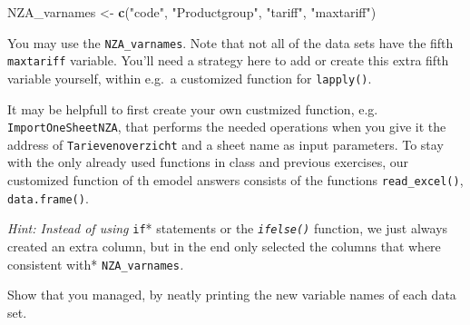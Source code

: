 \documentclass[]{article}
\newenvironment{Shaded}{\begin{snugshade}}{\end{snugshade}}
\newcommand{\KeywordTok}[1]{\textcolor[rgb]{0.13,0.29,0.53}{\textbf{#1}}}
\newcommand{\NormalTok}[1]{#1}
\newcommand{\StringTok}[1]{\textcolor[rgb]{0.31,0.60,0.02}{#1}}
\begin{document}
\begin{Shaded}
\begin{Highlighting}[]
\NormalTok{NZA_varnames <-}\StringTok{ }\KeywordTok{c}\NormalTok{(}\StringTok{"code"}\NormalTok{, }\StringTok{"Productgroup"}\NormalTok{, }\StringTok{"tariff"}\NormalTok{, }\StringTok{"maxtariff"}\NormalTok{)}
\end{Highlighting}
\end{Shaded}

You may use the \texttt{NZA\_varnames}. Note that not all of the data
sets have the fifth \texttt{maxtariff} variable. You'll need a strategy
here to add or create this extra fifth variable yourself, within e.g.~a
customized function for \texttt{lapply()}.

It may be helpfull to first create your own custmized function, e.g.
\texttt{ImportOneSheetNZA}, that performs the needed operations when you
give it the address of \texttt{Tarievenoverzicht} and a sheet name as
input parameters. To stay with the only already used functions in class
and previous exercises, our customized function of th emodel answers
consists of the functions \texttt{read\_excel()}, \texttt{data.frame()}.

\emph{Hint: Instead of using }\texttt{if}* statements or the
\emph{\texttt{ifelse()}} function, we just always created an extra
column, but in the end only selected the columns that where consistent
with* \texttt{NZA\_varnames}\emph{.}

Show that you managed, by neatly printing the new variable names of each
data set.
\end{document}
